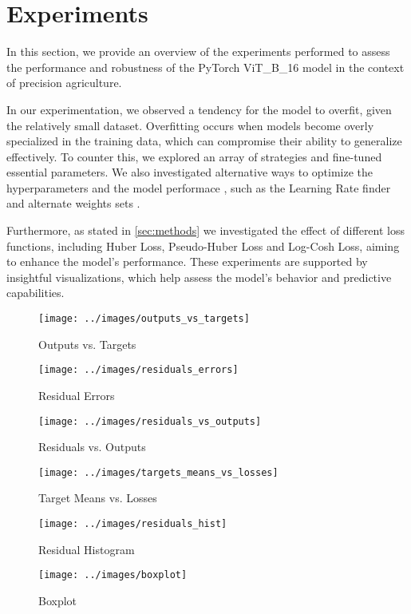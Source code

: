 \section{Experiments}
\label{sec:experiments}

In this section, we provide an overview of the experiments performed to assess the performance and robustness of the PyTorch ViT\_B\_16 model in the context of precision agriculture.

In our experimentation, we observed a tendency for the model to overfit, given the relatively small dataset. Overfitting occurs when models become overly specialized in the training data, which can compromise their ability to generalize effectively. To counter this, we explored an array of strategies and fine-tuned essential parameters. We also investigated alternative ways to optimize the hyperparameters and the model performace \cite{touvron2021training}, such as the Learning Rate finder \cite{smith2017cyclical} and alternate weights sets \cite{singh2022revisiting}.

Furthermore, as stated in \ref{sec:methods} we investigated the effect of different loss functions, including Huber Loss, Pseudo-Huber Loss and Log-Cosh Loss, aiming to enhance the model's performance. These experiments are supported by insightful visualizations, which help assess the model's behavior and predictive capabilities.

\begin{figure*}
    \begin{subfigure}{0.66\columnwidth}
        \texttt{[image: ../images/outputs\_vs\_targets]}
        \caption{Outputs vs. Targets}
        \label{fig:outputs_vs_targets}
    \end{subfigure}
    \hfill
    \begin{subfigure}{0.66\columnwidth}
        \texttt{[image: ../images/residuals\_errors]}
        \caption{Residual Errors}
        \label{fig:residuals_errors}
    \end{subfigure}
    \hfill
    \begin{subfigure}{0.66\columnwidth}
        \texttt{[image: ../images/residuals\_vs\_outputs]}
        \caption{Residuals vs. Outputs}
        \label{fig:residuals_vs_outputs}
    \end{subfigure}
    \hfill
    \begin{subfigure}{0.66\columnwidth}
        \texttt{[image: ../images/targets\_means\_vs\_losses]}
        \caption{Target Means vs. Losses}
        \label{fig:targets_means_vs_losses}
    \end{subfigure}
    \hfill
    \begin{subfigure}{0.66\columnwidth}
        \texttt{[image: ../images/residuals\_hist]}
        \caption{Residual Histogram}
        \label{fig:residuals_hist}
    \end{subfigure}
    \hfill
    \begin{subfigure}{0.66\columnwidth}
        \texttt{[image: ../images/boxplot]}
        \caption{Boxplot}
        \label{fig:boxplot}
    \end{subfigure}
    \hfill
\end{figure*}

